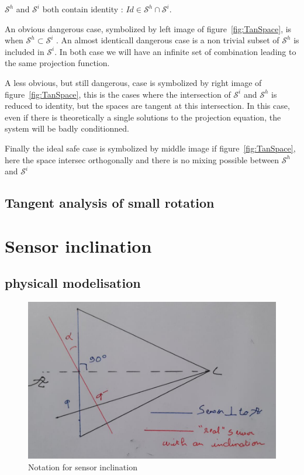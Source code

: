 $\mathcal{S}^h$ and $ \mathcal{S}^i$  both contain identity  : $Id \in \mathcal{S}^h \cap \mathcal{S}^i$. 

An obvious dangerous case, symbolized by left image of
figure~\ref{fig:TanSpace},  is when $\mathcal{S}^h \subset \mathcal{S}^i$ .
An almost identicall dangerous case is a non trivial subset of $\mathcal{S}^h$
is included in  $\mathcal{S}^i$. In both case we will have an infinite set of combination
leading to the same projection function.


A less obvious, but still dangerous, case is symbolized by right image of figure~\ref{fig:TanSpace},
this is the cases where the intersection of $\mathcal{S}^i$ and $\mathcal{S}^h$   is reduced to 
identity, but the spaces are tangent at this intersection. In this case, even if there is theoretically
a single solutions to  the projection equation, the system will be badly conditionned.

Finally the ideal safe case is symbolized by middle image if figure~\ref{fig:TanSpace}, here
the space intersec orthogonally and there is no mixing possible between $\mathcal{S}^h$ and $\mathcal{S}^i$


\subsection{Tangent analysis of small rotation}



\section{Sensor inclination}


\subsection{physicall modelisation}

\begin{figure}
\centering
\includegraphics[width=12cm]{Methods/Images/PlanIncl.jpg}\caption{Notation for sensor inclination}
	\label{fig:PlaneIncl}
\end{figure}

